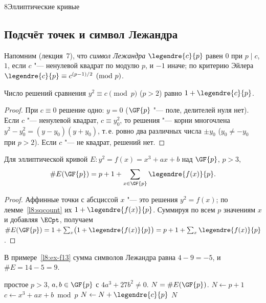 \begin{lecture}{8}{Эллиптические кривые}


\subsection{Подсчёт точек и символ Лежандра}

Напомним (лекция~7), что \emph{символ Лежандра} $\legendre{c}{p}$ равен $0$ при
$p \mid c$, $1$, если $c$ "--- ненулевой квадрат по модулю $p$, и $-1$ иначе; по критерию Эйлера
$\legendre{c}{p} \equiv c^{(p-1)/2} \pmod p$.

\begin{lemma}\label{l8:sqcount}
Число решений сравнения $y^2 \equiv c \pmod p$ ($p > 2$) равно $1 + \legendre{c}{p}$.
\end{lemma}

\begin{proof}
При $c \equiv 0$ решение одно: $y = 0$ ($\GF{p}$ "--- поле, делителей нуля нет). Если $c$ "---
ненулевой квадрат, $c \equiv y_0^2$, то решения "--- корни многочлена
$y^2 - y_0^2 = (y - y_0)(y + y_0)$, т.\,е. ровно два различных числа $\pm y_0$ ($y_0 \ne -y_0$ при
$p > 2$). Если $c$ "--- не квадрат, решений нет.
\end{proof}

\begin{theorem}\label{l8:count}
Для эллиптической кривой $E\colon y^2 = f(x) = x^3 + ax + b$ над $\GF{p}$, $p > 3$,
\[
  \#E(\GF{p}) = p + 1 + \sum_{x \in \GF{p}} \legendre{f(x)}{p}.
\]
\end{theorem}

\begin{proof}
Аффинные точки с абсциссой $x$ "--- это решения $y^2 = f(x)$; по лемме~\ref{l8:sqcount} их
$1 + \legendre{f(x)}{p}$. Суммируя по всем $p$ значениям $x$ и добавляя $\ECpt$, получаем
$\#E(\GF{p}) = 1 + \sum_x \bigl(1 + \legendre{f(x)}{p}\bigr) = p + 1 + \sum_x \legendre{f(x)}{p}$.
\end{proof}

В примере~\ref{l8:ex-f13} сумма символов Лежандра равна $4 - 9 = -5$, и $\#E = 14 - 5 = 9$.

\begin{algorithm}\label{l8:countalg}
\begin{algorithmic}[1]
\Require простое $p > 3$, $a, b \in \GF{p}$ с $4a^3 + 27b^2 \ne 0$.
\Ensure $N = \#E(\GF{p})$.
\State $N \gets p + 1$
  \State $c \gets x^3 + ax + b \bmod p$
  \State $N \gets N + \legendre{c}{p}$ 
\EndFor
\State \Return $N$
\end{algorithmic}
\end{algorithm}


\end{lecture}

